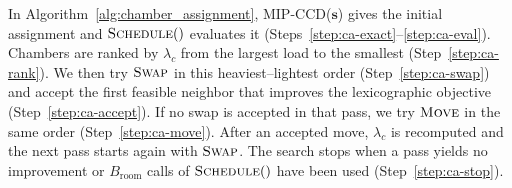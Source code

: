 In Algorithm~\ref{alg:chamber_assignment}, MIP-CCD(\(\mathbf{s}\)) gives the initial assignment and \(\textsc{Schedule}()\) evaluates it (Steps~\ref{step:ca-exact}--\ref{step:ca-eval}). Chambers are ranked by \(\lambda_c\) from the largest load to the smallest (Step~\ref{step:ca-rank}). We then try \(\textsc{Swap}\) in this heaviest--lightest order (Step~\ref{step:ca-swap}) and accept the first feasible neighbor that improves the lexicographic objective (Step~\ref{step:ca-accept}). If no swap is accepted in that pass, we try \(\textsc{Move}\) in the same order (Step~\ref{step:ca-move}). After an accepted move, \(\lambda_c\) is recomputed and the next pass starts again with \(\textsc{Swap}\). The search stops when a pass yields no improvement or \(B_{\mathrm{room}}\) calls of \(\textsc{Schedule}()\) have been used (Step~\ref{step:ca-stop}).
